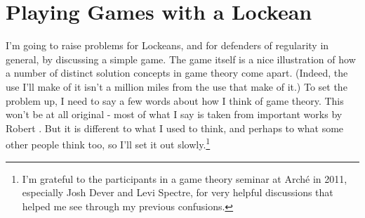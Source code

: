 %
%
%

\section{Playing Games with a Lockean}

I'm going to raise problems for Lockeans, and for defenders of regularity in general, by discussing a simple game. The game itself is a nice illustration of how a number of distinct solution concepts in game theory come apart. (Indeed, the use I'll make of it isn't a million miles from the use that  \cite{KohlbergMertens1986} make of it.) To set the problem up, I need to say a few words about how I think of game theory. This won't be at all original - most of what I say is taken from important works by Robert \cite{Stalnaker1994, Stalnaker1996, Stalnaker1998, Stalnaker1999}. But it is different to what I used to think, and perhaps to what some other people think too, so I'll set it out slowly.\footnote{I'm grateful to the participants in a game theory seminar at Arch\'e in 2011, especially Josh Dever and Levi Spectre, for very helpful discussions that helped me see through my previous confusions.}

